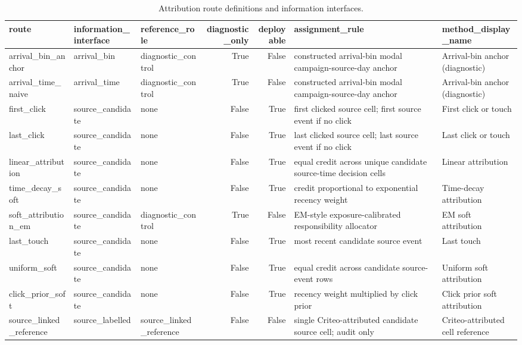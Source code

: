 \begin{table}
\caption{Attribution route definitions and information interfaces.}
\label{tab:app_exp2_attribution_routes}
\begin{tabular}{lllrrll}
\toprule
route & information\_interface & reference\_role & diagnostic\_only & deployable & assignment\_rule & method\_display\_name \\
\midrule
arrival\_bin\_anchor & arrival\_bin & diagnostic\_control & True & False & constructed arrival-bin modal campaign-source-day anchor & Arrival-bin anchor (diagnostic) \\
arrival\_time\_naive & arrival\_time & diagnostic\_control & True & False & constructed arrival-bin modal campaign-source-day anchor & Arrival-bin anchor (diagnostic) \\
first\_click & source\_candidate & none & False & True & first clicked source cell; first source event if no click & First click or touch \\
last\_click & source\_candidate & none & False & True & last clicked source cell; last source event if no click & Last click or touch \\
linear\_attribution & source\_candidate & none & False & True & equal credit across unique candidate source-time decision cells & Linear attribution \\
time\_decay\_soft & source\_candidate & none & False & True & credit proportional to exponential recency weight & Time-decay attribution \\
soft\_attribution\_em & source\_candidate & diagnostic\_control & True & False & EM-style exposure-calibrated responsibility allocator & EM soft attribution \\
last\_touch & source\_candidate & none & False & True & most recent candidate source event & Last touch \\
uniform\_soft & source\_candidate & none & False & True & equal credit across candidate source-event rows & Uniform soft attribution \\
click\_prior\_soft & source\_candidate & none & False & True & recency weight multiplied by click prior & Click prior soft attribution \\
source\_linked\_reference & source\_labelled & source\_linked\_reference & False & False & single Criteo-attributed candidate source cell; audit only & Criteo-attributed cell reference \\
\bottomrule
\end{tabular}
\end{table}

